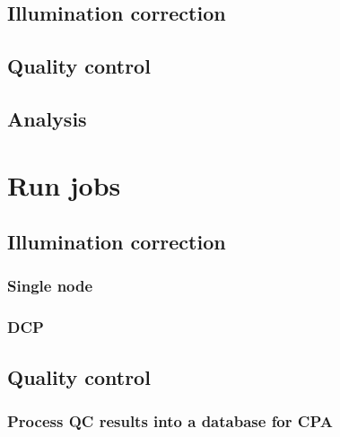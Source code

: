 \documentclass[]{book}
\begin{document}
\hypertarget{illumination-correction}{%
\section{Illumination correction}\label{illumination-correction}}

\hypertarget{quality-control}{%
\section{Quality control}\label{quality-control}}

\hypertarget{analysis}{%
\section{Analysis}\label{analysis}}

\hypertarget{run-jobs}{%
\chapter{Run jobs}\label{run-jobs}}

\hypertarget{illumination-correction-1}{%
\section{Illumination correction}\label{illumination-correction-1}}

\hypertarget{single-node}{%
\subsection{Single node}\label{single-node}}

\hypertarget{dcp}{%
\subsection{DCP}\label{dcp}}

\hypertarget{quality-control-1}{%
\section{Quality control}\label{quality-control-1}}

\hypertarget{process-qc-results-into-a-database-for-cpa}{%
\subsection{Process QC results into a database for
CPA}\label{process-qc-results-into-a-database-for-cpa}}
\end{document}
